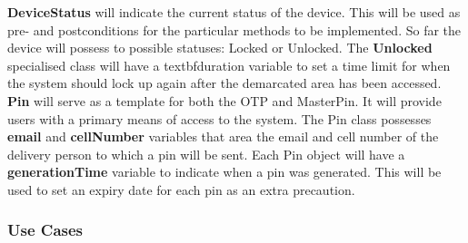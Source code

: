 \documentclass[a4paper,12pt]{article}
\begin{document}
	{\noindent}\textbf{DeviceStatus} will indicate the current status of the device. This will be used as pre- and postconditions for the particular methods to be implemented. So far the device will possess to possible statuses: Locked or Unlocked. The \textbf{Unlocked} specialised class will have a textbf{duration} variable to set a time limit for when the system should lock up again after the demarcated area has been accessed.\\
	
	{\noindent}\textbf{Pin} will serve as a template for both the OTP and MasterPin. It will provide users with a primary means of access to the system. The Pin class possesses \textbf{email} and \textbf{cellNumber} variables that area the email and cell number of the delivery person to which a pin will be sent. Each Pin object will have a \textbf{generationTime} variable to indicate when a pin was generated. This will be used to set an expiry date for each pin as an extra precaution. 	
	
	\subsubsection{Use Cases}
	
\end{document}
